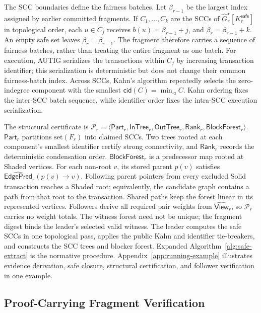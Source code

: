 The SCC boundaries define the fairness batches. Let $\beta_{r-1}$ be the largest index assigned by earlier committed fragments.  If $C_1,\ldots,C_k$ are the SCCs of
$\widehat G_r^\star[K_r^{\mathsf{safe}}]$ in topological order, each $u\in C_j$ receives $b(u)=\beta_{r-1}+j$, and
$\beta_r=\beta_{r-1}+k$. An empty safe set leaves $\beta_r=\beta_{r-1}$.  The fragment therefore carries
a sequence of fairness batches, rather than treating the entire fragment as one batch.  For execution, AUTIG serializes the transactions within $C_j$ by increasing transaction identifier; this serialization is deterministic but does not change their common fairness-batch index. Across SCCs, Kahn's algorithm repeatedly selects the zero-indegree component with the smallest
$\mathsf{cid}(C)=\min_{\triangleleft} C$.  Kahn ordering fixes the inter-SCC batch sequence, while identifier order
fixes the intra-SCC execution serialization.

The structural certificate is $\mathcal P_r=\langle\mathsf{Part}_r,\mathsf{InTree}_r, \mathsf{OutTree}_r,\mathsf{Rank}_r,\mathsf{BlockForest}_r\rangle$. $\mathsf{Part}_r$ partitions $\mathrm{set}(F_r)$ into claimed SCCs. Two trees rooted at each component's smallest identifier certify strong connectivity, and $\mathsf{Rank}_r$ records the deterministic condensation order. $\mathsf{BlockForest}_r$ is a predecessor map rooted at Shaded vertices. For each non-root $v$, its stored parent $p(v)$ satisfies $\widehat{\mathsf{EdgePred}}_r(p(v)\to v)$. Following parent pointers from every excluded Solid transaction reaches a Shaded root; equivalently, the
candidate graph contains a path from that root to the transaction. Shared paths keep the forest linear in its represented vertices. Followers derive all required pair weights from $\widehat{\mathsf{View}}_r$, so $\mathcal P_r$ carries no weight totals. The witness forest need not be unique; the fragment digest binds the leader's selected valid witness. The leader computes the safe SCCs in one topological pass, applies the public Kahn and identifier tie-breakers, and constructs the SCC trees and blocker forest. Expanded Algorithm~\ref{alg:safe-extract} is the normative procedure. Appendix~\ref{app:running-example} illustrates evidence derivation, safe closure, structural certification, and follower verification in one example.

\subsection{Proof-Carrying Fragment Verification}
\label{sec:proof-carrying-verification}

